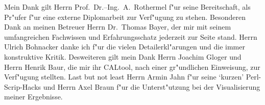 Mein Dank gilt Herrn Prof.\ Dr.--Ing.\ A.\ Rothermel f"ur seine Bereitschaft, als Pr"ufer f"ur eine
externe Diplomarbeit zur Verf"ugung zu stehen. Besonderen Dank an meinen Betreuer Herrn 
Dr.\ Thomas Bayer, der mir mit seinem umfangreichen Fachwissen und Erfahrungsschatz jederzeit
zur Seite stand. Herrn Ulrich Bohnacker danke ich f"ur die vielen Detailerkl"arungen und
die immer konstruktive Kritik. Desweiteren gilt mein Dank Herrn Joachim Gloger und Herrn 
Henrik Baur, die mir ihr CALtool, nach einer gr"undlichen Einweisung, zur Verf"ugung stellten. 
Last but not least Herrn Armin Jahn f"ur seine `kurzen' Perl-Scrip-Hacks und Herrn Axel Braun 
f"ur die Unterst"utzung bei der Visualisierung meiner Ergebnisse.
